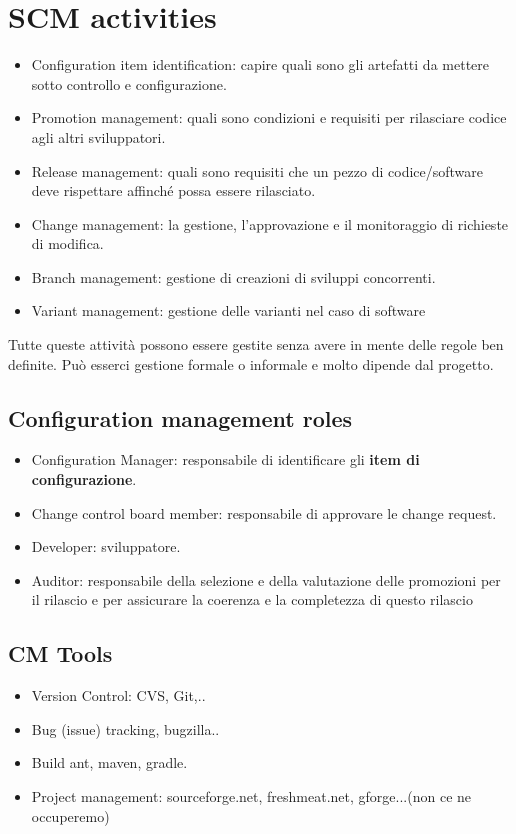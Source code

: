 \documentclass[10pt,a4paper]{book}
\begin{document}
\section{SCM activities}
\begin{itemize}
\item Configuration item identification: capire quali sono gli artefatti da mettere sotto controllo e configurazione.
\item Promotion management: quali sono condizioni e requisiti per rilasciare codice agli altri sviluppatori.
\item Release management: quali sono requisiti che un pezzo di codice/software deve rispettare affinché possa essere rilasciato.
\item Change management: la gestione, l'approvazione e il monitoraggio di richieste di modifica.
\item Branch management: gestione di creazioni di sviluppi concorrenti.
\item Variant management: gestione delle varianti nel caso di software
\end{itemize}

Tutte queste attività possono essere gestite senza avere in mente delle regole ben definite. Può esserci gestione formale o informale e molto dipende dal progetto.

\subsection{Configuration management roles}
\begin{itemize}
\item Configuration Manager: responsabile di identificare gli \textbf{item di configurazione}.
\item Change control board member: responsabile di approvare le change request.
\item Developer: sviluppatore.
\item Auditor: responsabile della selezione e della valutazione delle promozioni per il rilascio e per assicurare la coerenza e la completezza di questo rilascio
\end{itemize}


\subsection{CM Tools}
\begin{itemize}
\item Version Control: CVS, Git,..
\item Bug (issue) tracking, bugzilla..
\item Build ant, maven, gradle.
\item Project management: sourceforge.net, freshmeat.net, gforge...(non ce ne occuperemo)

\end{itemize}
\end{document}
